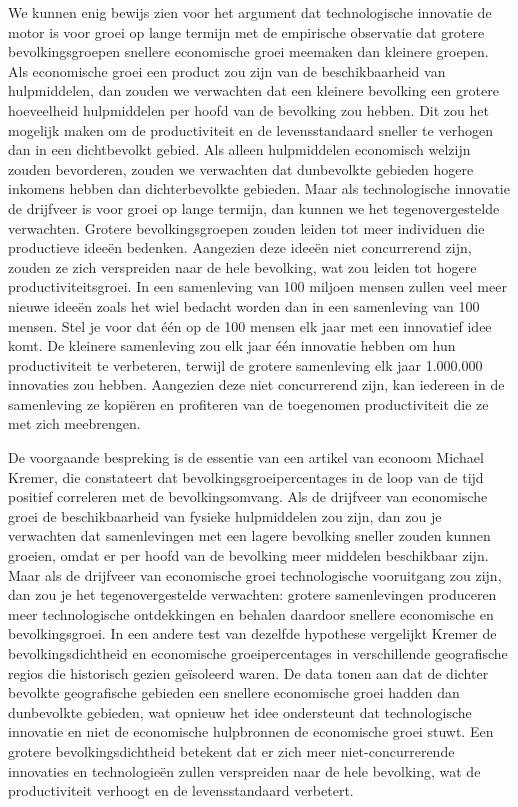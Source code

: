 We kunnen enig bewijs zien voor het argument dat technologische innovatie de motor is voor groei op lange termijn met de empirische observatie dat grotere bevolkingsgroepen snellere economische groei meemaken dan kleinere groepen. Als economische groei een product zou zijn van de beschikbaarheid van hulpmiddelen, dan zouden we verwachten dat een kleinere bevolking een grotere hoeveelheid hulpmiddelen per hoofd van de bevolking zou hebben. Dit zou het mogelijk maken om de productiviteit en de levensstandaard sneller te verhogen dan in een dichtbevolkt gebied. Als alleen hulpmiddelen economisch welzijn zouden bevorderen, zouden we verwachten dat dunbevolkte gebieden hogere inkomens hebben dan dichterbevolkte gebieden. Maar als technologische innovatie de drijfveer is voor groei op lange termijn, dan kunnen we het tegenovergestelde verwachten. Grotere bevolkingsgroepen zouden leiden tot meer individuen die productieve ideeën bedenken. Aangezien deze ideeën niet concurrerend zijn, zouden ze zich verspreiden naar de hele bevolking, wat zou leiden tot hogere productiviteitsgroei. In een samenleving van 100 miljoen mensen zullen veel meer nieuwe ideeën zoals het wiel bedacht worden dan in een samenleving van 100 mensen. Stel je voor dat één op de 100 mensen elk jaar met een innovatief idee komt. De kleinere samenleving zou elk jaar één innovatie hebben om hun productiviteit te verbeteren, terwijl de grotere samenleving elk jaar 1.000.000 innovaties zou hebben. Aangezien deze niet concurrerend zijn, kan iedereen in de samenleving ze kopiëren en profiteren van de toegenomen productiviteit die ze met zich meebrengen.

De voorgaande bespreking is de essentie van een artikel van econoom Michael Kremer, die constateert dat bevolkingsgroeipercentages in de loop van de tijd positief correleren met de bevolkingsomvang. Als de drijfveer van economische groei de beschikbaarheid van fysieke hulpmiddelen zou zijn, dan zou je verwachten dat samenlevingen met een lagere bevolking sneller zouden kunnen groeien, omdat er per hoofd van de bevolking meer middelen beschikbaar zijn. Maar als de drijfveer van economische groei technologische vooruitgang zou zijn, dan zou je het tegenovergestelde verwachten: grotere samenlevingen produceren meer technologische ontdekkingen en behalen daardoor snellere economische en bevolkingsgroei.\autocite{77} In een andere test van dezelfde hypothese vergelijkt Kremer de bevolkingsdichtheid en economische groeipercentages in verschillende geografische regio\textquotesingle s die historisch gezien geïsoleerd waren. De data tonen aan dat de dichter bevolkte geografische gebieden een snellere economische groei hadden dan dunbevolkte gebieden, wat opnieuw het idee ondersteunt dat technologische innovatie en niet de economische hulpbronnen de economische groei stuwt. Een grotere bevolkingsdichtheid betekent dat er zich meer niet-concurrerende innovaties en technologieën zullen verspreiden naar de hele bevolking, wat de productiviteit verhoogt en de levensstandaard verbetert.

